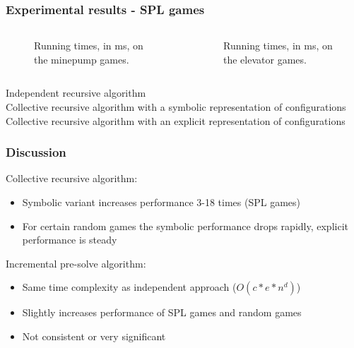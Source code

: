 \documentclass[aspectratio=169]{beamer}
\begin{document}
\begin{frame}[t]
\frametitle{Experimental results - SPL games}
\def\scalegraphs{0.6}
\begin{columns}[T]
	\begin{column}{0.5\textwidth}
		\begin{figure}[H]
			
			\caption{Running times, in ms, on the minepump games.}
			\label{fig:results_minepump}
		\end{figure}%
	\end{column}
	\begin{column}{0.5\textwidth}
		\begin{figure}[H]
			
			\caption{Running times, in ms, on the elevator games.}
			\label{fig:results_elevator}
		\end{figure}%
	\end{column}
\end{columns}
\small
{} Independent recursive algorithm\\
 Collective recursive algorithm with a symbolic representation of configurations\\
 Collective recursive algorithm with an explicit representation of configurations\\
\end{frame}



\begin{frame}[t]
\frametitle{Discussion}
	\large Collective recursive algorithm:\\
	\begin{itemize}
		\item Symbolic variant increases performance 3-18 times (SPL games)
		\item For certain random games the symbolic performance drops rapidly, explicit performance is steady
	\end{itemize}\pause
	\large Incremental pre-solve algorithm:\\
	\begin{itemize}
		\item Same time complexity as independent approach ($O(c*e*n^d)$)
		\item Slightly increases performance of SPL games and random games
		\item Not consistent or very significant
	\end{itemize}
\end{frame}
\end{document}
